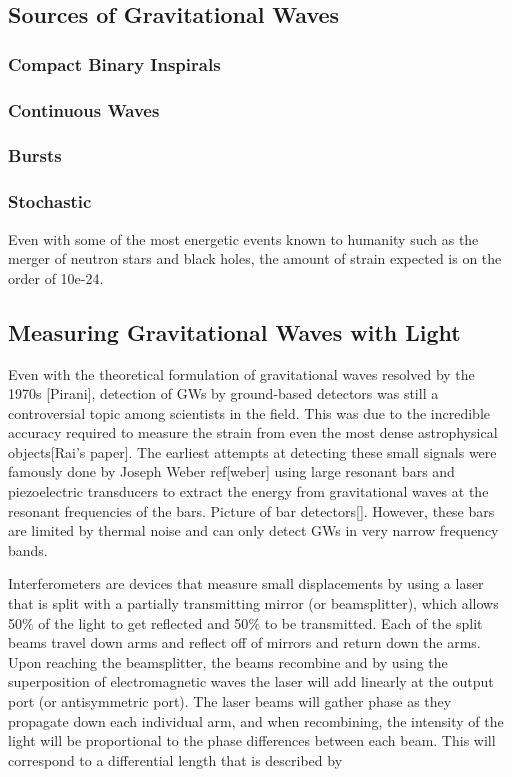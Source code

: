 \documentclass[oneside]{book}
\begin{document}
	\subsection{Sources of Gravitational Waves}
	\subsubsection{Compact Binary Inspirals}
	\subsubsection{Continuous Waves}
	\subsubsection{Bursts}
	\subsubsection{Stochastic}
	Even with some of the most energetic events known to humanity such as the merger of neutron stars and black holes, the amount of strain expected is on the order of 10e-24.
	
	\cite{Saulson}
	
	\subsection{Measuring Gravitational Waves with Light}\label{measuringGWs}
	Even with the theoretical formulation of gravitational waves resolved by the 1970s [Pirani], detection of GWs by ground-based detectors was still a controversial topic among scientists in the field.  This was due to the incredible accuracy required to measure the strain from even the most dense astrophysical objects[Rai's paper].  The earliest attempts at detecting these small signals were famously done by Joseph Weber ref[weber] using large resonant bars and piezoelectric transducers to extract the energy from gravitational waves at the resonant frequencies of the bars. Picture of bar detectors[].  However, these bars are limited by thermal noise and can only detect GWs in very narrow frequency bands. 
	
	Interferometers are devices that measure small displacements by using a laser that is split with a partially transmitting mirror (or beamsplitter), which allows 50$\%$ of the light to get reflected and 50$\%$ to be transmitted.  Each of the split beams travel down arms and reflect off of mirrors and return down the arms.  Upon reaching the beamsplitter, the beams recombine and by using the superposition of electromagnetic waves the laser will add linearly at the output port (or antisymmetric port).  The laser beams will gather phase as they propagate down each individual arm, and when recombining, the intensity of the light will be proportional to the phase differences between each beam.  This will correspond to a differential length that is described by
	
\end{document}
